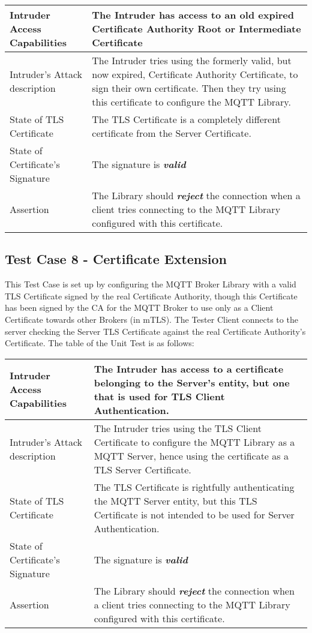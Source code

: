 \documentclass[binding=0.6cm,noexaminfo]{sapthesis}
\begin{document}
\begin{center}
\begin{tabular}{| p{6cm} | p{6cm} |}
\hline
Intruder Access Capabilities & The Intruder has access to an old expired Certificate Authority Root or Intermediate Certificate \\
\hline
Intruder’s Attack description & The Intruder tries using the formerly valid, but now expired, Certificate Authority Certificate, to sign their own certificate. Then they try using this certificate to configure the MQTT Library. \\
\hline
State of TLS Certificate & The TLS Certificate is a completely different certificate from the Server Certificate. \\
\hline
State of Certificate’s Signature & The signature is \textbf{\textit{valid}} \\
\hline
Assertion & The Library should \textbf{\textit{reject}} the connection when a client tries connecting to the MQTT Library configured with this certificate. \\
\hline
\end{tabular}
\end{center}

\subsection{Test Case 8 - Certificate Extension}
This Test Case is set up by configuring the MQTT Broker Library with a valid TLS Certificate signed by the real Certificate Authority, though this Certificate has been signed by the CA for the MQTT Broker to use only as a Client Certificate towards other Brokers (in mTLS). The Tester Client connects to the server checking the Server TLS Certificate against the real Certificate Authority’s Certificate. The table of the Unit Test is as follows:

\begin{center}
\begin{tabular}{| p{6cm} | p{6cm} |}
\hline
Intruder Access Capabilities & The Intruder has access to a certificate belonging to the Server’s entity, but one that is used for TLS Client Authentication. \\
\hline
Intruder’s Attack description & The Intruder tries using the TLS Client Certificate to configure the MQTT Library as a MQTT Server, hence using the certificate as a TLS Server Certificate. \\
\hline
State of TLS Certificate & The TLS Certificate is rightfully authenticating the MQTT Server entity, but this TLS Certificate is not intended to be used for Server Authentication. \\
\hline
State of Certificate’s Signature & The signature is \textbf{\textit{valid}} \\
\hline
Assertion & The Library should \textbf{\textit{reject}} the connection when a client tries connecting to the MQTT Library configured with this certificate. \\
\hline
\end{tabular}
\end{center}
\end{document}
